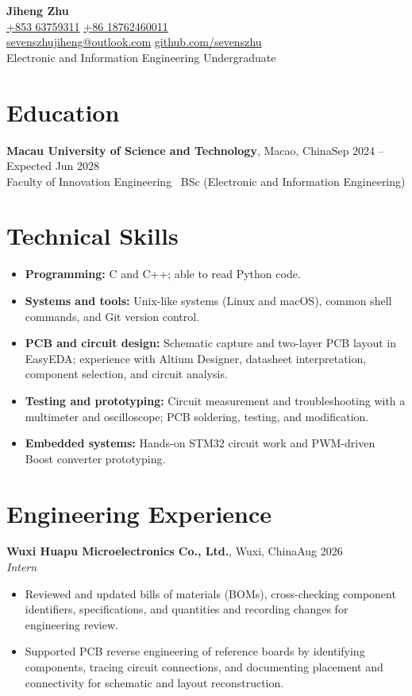 \documentclass[10pt,a4paper]{article}
\begin{document}
\raggedright

\begin{center}
  {\LARGE\bfseries Jiheng Zhu}\\[6pt]
  \href{tel:+85363759311}{+853 63759311}\quad\textbar\quad
  \href{tel:+8618762460011}{+86 18762460011}\\[2pt]
  \href{mailto:sevenszhujiheng@outlook.com}{sevenszhujiheng@outlook.com}\quad\textbar\quad
  \href{https://github.com/sevenszhu}{github.com/sevenszhu}\\[3pt]
  Electronic and Information Engineering Undergraduate
\end{center}

\section*{Education}
\textbf{Macau University of Science and Technology}, Macao, China\hfill Sep 2024 -- Expected Jun 2028\\
Faculty of Innovation Engineering \textbar\ BSc (Electronic and Information Engineering)

\section*{Technical Skills}
\begin{itemize}
  \item \textbf{Programming:} C and C++; able to read Python code.
  \item \textbf{Systems and tools:} Unix-like systems (Linux and macOS), common shell commands, and Git version control.
  \item \textbf{PCB and circuit design:} Schematic capture and two-layer PCB layout in EasyEDA; experience with Altium Designer, datasheet interpretation, component selection, and circuit analysis.
  \item \textbf{Testing and prototyping:} Circuit measurement and troubleshooting with a multimeter and oscilloscope; PCB soldering, testing, and modification.
  \item \textbf{Embedded systems:} Hands-on STM32 circuit work and PWM-driven Boost converter prototyping.
\end{itemize}

\section*{Engineering Experience}
\textbf{Wuxi Huapu Microelectronics Co., Ltd.}, Wuxi, China\hfill Aug 2026\\
\textit{Intern}
\begin{itemize}
  \item Reviewed and updated bills of materials (BOMs), cross-checking component identifiers, specifications, and quantities and recording changes for engineering review.
  \item Supported PCB reverse engineering of reference boards by identifying components, tracing circuit connections, and documenting placement and connectivity for schematic and layout reconstruction.
\end{itemize}
\end{document}
